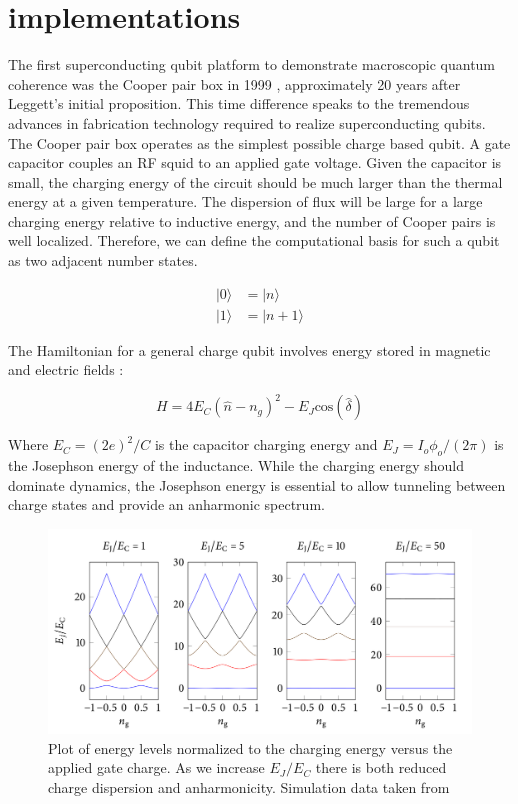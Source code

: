 \documentclass[%
 reprint,
showpacs,
 amsmath,amssymb,
 aps,
longbibliography,
]{revtex4-1}
\begin{document}
\section{implementations}
The first superconducting qubit platform to demonstrate macroscopic quantum coherence was the Cooper pair box in 1999 \cite{Nakamura_1999}, approximately 20 years after Leggett's initial proposition. This time difference speaks to the tremendous advances in fabrication technology required to realize superconducting qubits.  The Cooper pair box operates as the simplest possible charge based qubit. A gate capacitor couples an RF squid to an applied gate voltage. Given the capacitor is small, the charging energy of the circuit should be much larger than the thermal energy at a given temperature. The dispersion of flux will be large for a large charging energy relative to inductive energy, and the number of Cooper pairs is well localized. Therefore, we can define the computational basis for such a qubit as two adjacent number states.

\begin{align*}
|0\rangle &= |n\rangle \\
|1\rangle &= |n+1\rangle
\end{align*}

The Hamiltonian for a general charge qubit involves energy stored in magnetic and electric fields :

\begin{equation*}
H = 4E_C (\hat{n}-n_g)^2 - E_J \textrm{cos}(\hat{\delta})
\end{equation*}

Where  $E_C = (2e)^2/C$ is the capacitor charging energy and $E_J=I_o\phi_o /(2\pi)$ is the Josephson energy of the inductance.
While the charging energy should dominate dynamics, the Josephson energy is essential to allow tunneling between charge states and provide an anharmonic spectrum.
\begin{figure}[h!]
  \includegraphics[width=\linewidth]{charge_dispersion_full.png}
  \caption{Plot of energy levels normalized to the charging energy versus the applied gate charge. As we increase $E_J/E_C$ there is both reduced charge dispersion and anharmonicity. Simulation data taken from \ \cite{bishop}}
  \label{fig:cd}
\end{figure}
\end{document}
